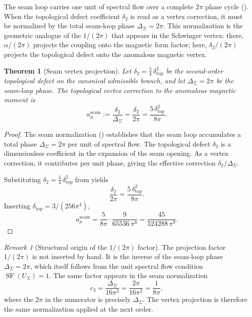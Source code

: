 \documentclass[11pt,a4paper]{article}
\newtheorem{theorem}{Theorem}[section]
\theoremstyle{definition}
\theoremstyle{remark}
\newtheorem*{remark}{Remark}
\DeclareMathOperator{\SF}{SF}
\newcommand{\Seam}{\Sigma}
\newcommand{\cthree}{c_3}
\newcommand{\deltatop}{\delta_{\mathrm{top}}}
\numberwithin{equation}{section}
\begin{document}
The seam loop carries one unit of spectral flow over a complete $2\pi$ phase
cycle (). When the topological defect coefficient
$\delta_2$ is read as a vertex correction, it must be normalized by the total
seam-loop phase $\Delta_\Seam=2\pi$. This normalization is the geometric
analogue of the $1/(2\pi)$ that appears in the Schwinger vertex: there,
$\alpha/(2\pi)$ projects the coupling onto the magnetic form factor; here,
$\delta_2/(2\pi)$ projects the topological defect onto the anomalous
magnetic vertex.

\begin{theorem}[Seam vertex projection]\label{thm:seam-vertex}
Let $\delta_2=\frac54\,\deltatop^2$ be the second-order topological defect on
the canonical admissible branch, and let $\Delta_\Seam=2\pi$ be the seam-loop
phase. The topological vertex correction to the anomalous magnetic moment is
\begin{equation}\label{eq:seam-vertex}
a_\mu^{\mathrm{seam}}
:=
\frac{\delta_2}{\Delta_\Seam}
=
\frac{\delta_2}{2\pi}
=
\frac{5\,\deltatop^2}{8\pi}.
\end{equation}
\end{theorem}

\begin{proof}
The seam normalization () establishes that the
seam loop accumulates a total phase $\Delta_\Seam=2\pi$ per unit of spectral
flow. The topological defect $\delta_2$ is a dimensionless coefficient in the
expansion of the seam opening. As a vertex correction, it contributes per unit
phase, giving the effective correction $\delta_2/\Delta_\Seam$.

Substituting $\delta_2=\frac54\,\deltatop^2$ from
 yields
\[
\frac{\delta_2}{2\pi}
=
\frac{5\,\deltatop^2}{8\pi}.
\]
Inserting $\deltatop=3/(256\pi^4)$,
\[
a_\mu^{\mathrm{seam}}
=
\frac{5}{8\pi}
\cdot
\frac{9}{65536\,\pi^8}
=
\frac{45}{524288\,\pi^9}.
\]
\end{proof}

\begin{remark}[Structural origin of the $1/(2\pi)$ factor]
The projection factor $1/(2\pi)$ is not inserted by hand. It is the inverse
of the seam-loop phase $\Delta_\Seam=2\pi$, which itself follows from the
unit spectral flow condition $\SF(U_\Seam)=1$. The same factor appears in the
seam normalization
\[
\cthree=\frac{\Delta_\Seam}{16\pi^2}=\frac{2\pi}{16\pi^2}=\frac{1}{8\pi},
\]
where the $2\pi$ in the numerator is precisely $\Delta_\Seam$. The vertex
projection is therefore the same normalization applied at the next order.
\end{remark}
\end{document}
